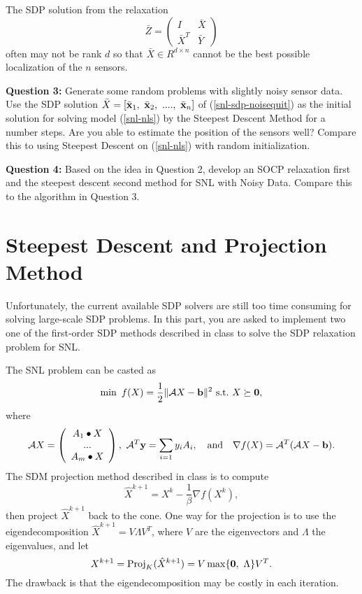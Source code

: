 \documentclass[10pt]{article}
\newcommand\x{{\bf x}}
\newcommand\y{{\bf y}}
\newcommand\bz{{\bf 0}}
\renewcommand\b{{\bf b}}
\begin{document}
The SDP solution from the relaxation
\[\bar Z=\left(\begin{array}{cc} I & \bar X\\
                                  \bar X^T & \bar Y\end{array}\right)
\] 
often may not be rank $d$ so that $\bar X\in R^{d\times n}$ cannot be the best possible localization of the $n$ sensors.

{\bf Question 3:} Generate some random problems with slightly noisy sensor data. Use the SDP solution $\bar X=[\bar\x_1,\ \bar\x_2,\ ....,\ \bar\x_n]$ of (\ref{snl-sdp-noisequit}) as the initial solution for solving model
(\ref{snl-nls}) by the Steepest Descent Method for a number steps. Are you able to estimate the position of the sensors well? Compare this to using Steepest Descent on (\ref{snl-nls}) with random initialization.
 
{\bf Question 4:} Based on the idea in Question 2, develop an SOCP relaxation first and the steepest descent second method for SNL with Noisy Data. Compare this to the algorithm in Question 3.


 \section{Steepest Descent and Projection Method}
Unfortunately, the current available SDP solvers are still too time consuming for solving large-scale SDP problems. In this part, you are asked
to implement two  one of the first-order SDP methods described in class to solve the SDP relaxation problem for SNL.

The SNL problem can be casted as
\[\min\ f(X)=\frac{1}{2}\|{\cal A}X-\b\|^2\ \mbox{s.t.}\ X\succeq \bz,\]
where
\[{\cal A}X=\left(\begin{array}{c}
                               A_1\bullet X\\
                               ...\\
                               A_m\bullet X\end{array}\right),\ 
            {\cal A}^T\y=\sum_{i=1}y_iA_i, \quad\mbox{and}\quad
\nabla f(X)={\cal A}^T({\cal A}X-\b).                                      
                               \]
The SDM projection method described in class is to compute
\[\hat{X}^{k+1}=X^k-\frac{1}{\beta} \nabla f(X^k),\]
then project $\hat{X}^{k+1}$ back to the cone. One way for the projection is to use the eigendecomposition $\hat{X}^{k+1}=V\Lambda V^T$, where $V$ are the eigenvectors and $\Lambda$ the eigenvalues, and let
\[X^{k+1}=\mbox{Proj}_K(\hat{X}^{k+1})=V\max\{\bz,\ \Lambda\}V^T.\]
The drawback is that the eigendecomposition may be costly in each iteration.
\end{document}
